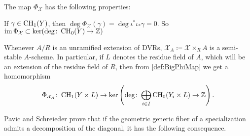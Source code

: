 The map $\Phi_{\mathcal{X}}$ has the following properties:
\begin{observation}
  If $ \gamma \in \operatorname{CH}_1(Y)$, then $\deg \Phi_{\mathcal{X}}(\gamma) = \deg \iota^* \iota_* \gamma = 0$. So $\operatorname{im} \Phi_{\mathcal{X}} \subset \ker (\deg \colon \operatorname{CH}_0(Y) \to \mathbb{Z})$
\end{observation}
\begin{observation}
  Whenever $A/R$ is an unramified extension of DVRs, $\mathcal{X}_A \coloneqq \mathcal{X} \times_{R} A$ is a semi-stable $A$-scheme. In particular, if $L$ denotes the residue field of $A$, which will be an extension of the residue field of $R$, then from \cref{def:BigPhiMap} we get a homomorphism
  \begin{equation}
    \label{eq:BigPhiMapOverA}
    \Phi_{\mathcal{X}_A} \colon \operatorname{CH}_1(Y \times L) \to \ker\left( \deg \colon \bigoplus_{i \in I} \operatorname{CH}_0(Y_{i} \times L) \to \mathbb{Z} \right).
  \end{equation}
\end{observation}


Pavic and Schreieder prove that if the geometric generic fiber of a specialization admits a decomposition of the diagonal, it has the following consequence. %

